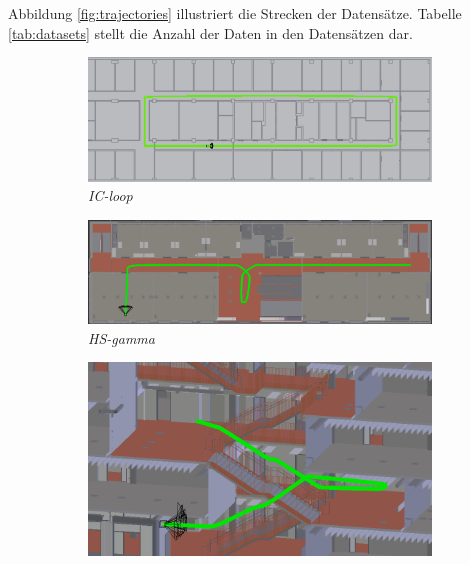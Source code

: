 Abbildung \ref{fig:trajectories} illustriert die Strecken der Datensätze. Tabelle \ref{tab:datasets} stellt die Anzahl der Daten in den Datensätzen dar.



\cleardoublepage

\begin{figure}[htp]
	\centering
	\begin{subfigure}[t]{1.0\linewidth}
		\centering
		\includegraphics[width=\linewidth]{images/trajectories/traj-ic.png}
		\caption{\textit{IC-loop}}
		\label{subfig:traj_ic}
	\end{subfigure}
	\hfill \medskip
	\begin{subfigure}[t]{1.0\linewidth}
		\centering
		\includegraphics[width=\linewidth]{images/trajectories/traj-hs-gamma.png}
		\caption{\textit{HS-gamma}}
		\label{subfig:traj_hs_gamma}
	\end{subfigure}
	\hfill \medskip
	\begin{subfigure}[tr]{0.45\linewidth}
		\flushleft
		\includegraphics[width=\linewidth]{images/trajectories/traj-stairs-up.png}

\end{subfigure}
\end{figure}
